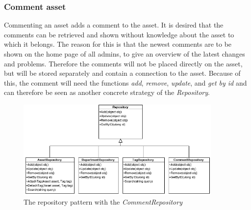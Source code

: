 \subsubsection{Comment asset}
Commenting an asset adds a comment to the asset. It is desired that the comments can be retrieved and shown without knowledge about the asset to which it belongs. The reason for this is that the newest comments are to be shown on the home page of all admins, to give an overview of the latest changes and problems. Therefore the comments will not be placed directly on the asset, but will be stored separately and contain a connection to the asset. Because of this, the comment will need the functions \textit{add}, \textit{remove}, \textit{update}, and \textit{get by id} and can therefore be seen as another concrete strategy of the \textit{Repository}.
\begin{figure}[H]
    \centering
    \includegraphics[width=0.9\textwidth]{figures/FunctionComponent/CommentRepository.png}
    \caption{The repository pattern with the \textit{CommentRepository}}
    \label{fig:RepositoryPatternWithCommentRepository}
\end{figure}


